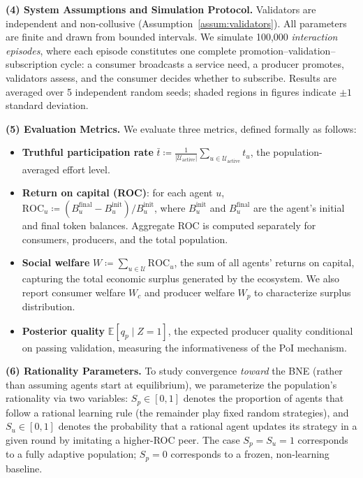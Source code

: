 \textbf{(4) System Assumptions and Simulation Protocol.}
Validators are independent and non-collusive (Assumption~\ref{assum:validators}). All parameters are finite and drawn from bounded intervals.
We simulate 100{,}000 \textit{interaction episodes}, where each episode constitutes one complete promotion--validation--subscription cycle: a consumer broadcasts a service need, a producer promotes, validators assess, and the consumer decides whether to subscribe.
Results are averaged over 5 independent random seeds; shaded regions in figures indicate $\pm 1$ standard deviation.

\textbf{(5) Evaluation Metrics.}
We evaluate three metrics, defined formally as follows:
\begin{itemize}
    \item \textbf{Truthful participation rate} $\bar{t} \coloneqq \frac{1}{|\mathcal{U}_{\text{active}}|} \sum_{u \in \mathcal{U}_{\text{active}}} t_u$, the population-averaged effort level.
    \item \textbf{Return on capital (ROC)}: for each agent $u$, $\text{ROC}_u \coloneqq (B_u^{\text{final}} - B_u^{\text{init}}) / B_u^{\text{init}}$, where $B_u^{\text{init}}$ and $B_u^{\text{final}}$ are the agent's initial and final token balances. Aggregate ROC is computed separately for consumers, producers, and the total population.
    \item \textbf{Social welfare} $W \coloneqq \sum_{u \in \mathcal{U}} \text{ROC}_u$, the sum of all agents' returns on capital, capturing the total economic surplus generated by the ecosystem. We also report consumer welfare $W_c$ and producer welfare $W_p$ to characterize surplus distribution.
    \item \textbf{Posterior quality} $\mathbb{E}[q_p \mid Z = 1]$, the expected producer quality conditional on passing validation, measuring the informativeness of the PoI mechanism.
\end{itemize}

\textbf{(6) Rationality Parameters.}
To study convergence \textit{toward} the BNE (rather than assuming agents start at equilibrium), we parameterize the population's rationality via two variables: $S_p \in [0, 1]$ denotes the proportion of agents that follow a rational learning rule (the remainder play fixed random strategies), and $S_u \in [0, 1]$ denotes the probability that a rational agent updates its strategy in a given round by imitating a higher-ROC peer. The case $S_p = S_u = 1$ corresponds to a fully adaptive population; $S_p = 0$ corresponds to a frozen, non-learning baseline.

